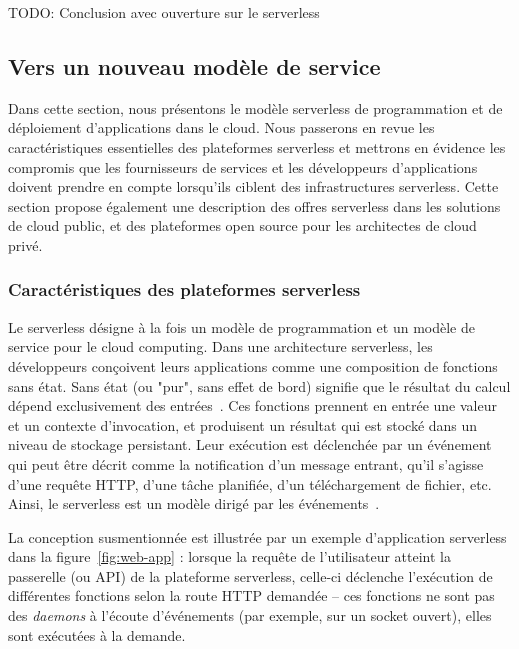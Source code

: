 TODO: Conclusion avec ouverture sur le serverless

\subsection{Vers un nouveau modèle de service}

Dans cette section, nous présentons le modèle serverless de programmation et de déploiement d'applications dans le cloud. Nous passerons en revue les caractéristiques essentielles des plateformes serverless et mettrons en évidence les compromis que les fournisseurs de services et les développeurs d'applications doivent prendre en compte lorsqu'ils ciblent des infrastructures serverless. Cette section propose également une description des offres serverless dans les solutions de cloud public, et des plateformes open source pour les architectes de cloud privé.

\subsubsection{Caractéristiques des plateformes serverless}

Le serverless désigne à la fois un modèle de programmation et un modèle de service pour le cloud computing. Dans une architecture serverless, les développeurs conçoivent leurs applications comme une composition de fonctions sans état. Sans état (ou "pur", sans effet de bord) signifie que le résultat du calcul dépend exclusivement des entrées~\cite{burckhardtNetheriteEfficientExecution}. Ces fonctions prennent en entrée une valeur et un contexte d'invocation, et produisent un résultat qui est stocké dans un niveau de stockage persistant. Leur exécution est déclenchée par un événement qui peut être décrit comme la notification d'un message entrant, qu'il s'agisse d'une requête HTTP, d'une tâche planifiée, d'un téléchargement de fichier, etc. Ainsi, le serverless est un modèle dirigé par les événements~\cite{SchleierSmith2021WhatSC}.

La conception susmentionnée est illustrée par un exemple d'application serverless dans la figure~\ref{fig:web-app} : lorsque la requête de l'utilisateur atteint la passerelle (ou API) de la plateforme serverless, celle-ci déclenche l'exécution de différentes fonctions selon la route HTTP demandée -- ces fonctions ne sont pas des \textit{daemons} à l'écoute d'événements (par exemple, sur un socket ouvert), elles sont exécutées à la demande.

